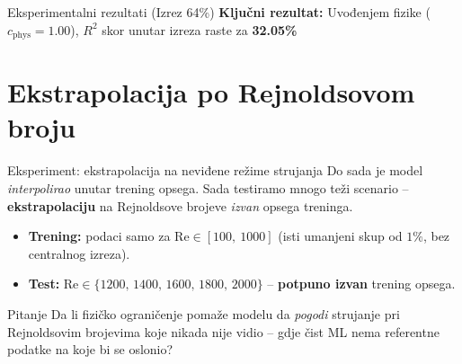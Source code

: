 \documentclass[10pt,aspectratio=169]{beamer}
\begin{document}
\begin{frame}{Eksperimentalni rezultati (Izrez 64\%)}
  \vspace{0.2cm} %
  \centering
  \footnotesize
  \textbf{Ključni rezultat:} Uvođenjem fizike ($c_{\text{phys}} = 1.00$), $R^2$ skor unutar izreza raste za  \textbf{32.05\%}
\end{frame}




\section{Ekstrapolacija po Rejnoldsovom broju}

\begin{frame}{Eksperiment: ekstrapolacija na neviđene režime strujanja}
  \small
  Do sada je model \emph{interpolirao} unutar trening opsega. Sada testiramo
  mnogo teži scenario -- \textbf{ekstrapolaciju} na Rejnoldsove brojeve
  \emph{izvan} opsega treninga.
  \vfill
  \begin{itemize}
    \item \textbf{Trening:} podaci samo za $\mathrm{Re}\in[100,\ 1000]$
          (isti umanjeni skup od $1\%$, bez centralnog izreza).
    \item \textbf{Test:} $\mathrm{Re}\in\{1200,\,1400,\,1600,\,1800,\,2000\}$
          -- \textbf{potpuno izvan} trening opsega.
  \end{itemize}
  \vfill
  \begin{block}{Pitanje}
    Da li fizičko ograničenje pomaže modelu da \emph{pogodi} strujanje pri
    Rejnoldsovim brojevima koje nikada nije vidio -- gdje čist ML nema
    referentne podatke na koje bi se oslonio?
  \end{block}
\end{frame}
\end{document}
